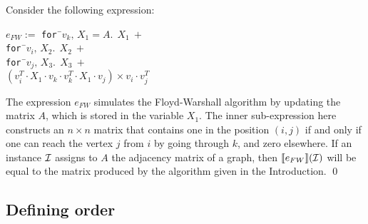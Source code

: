 \begin{example}\label{ex:floyd}
Consider the following expression:
\begin{center}
\parbox{0cm}{
\begin{tabbing}
$e_{FW} := $ \texttt{for\,}\=$v_k,\, X_1\!=\!A.\ \ X_1 \ + $\\
\> \texttt{for\,}\=$v_i, \, X_2.\ \ X_2 \ +$ \\
\>\>\texttt{for\,}\=$v_j,\, X_3.\ \ X_3 \ +$ \\
\>\>\>$(v_i^T\cdot X_1\cdot v_k \cdot v_k^T\cdot X_1\cdot v_j)\times v_i\cdot v_j^T$
\end{tabbing}
}
\end{center}
The expression $e_{FW}$ simulates the Floyd-Warshall algorithm by updating the matrix $A$, which is stored in the variable $X_1$. The inner sub-expression here constructs an $n\times n$ matrix that contains one in the position $(i,j)$ if and only if one can reach the vertex $j$ from $i$ by going through $k$, and zero elsewhere. If an instance $\mathcal{I}$ assigns to $A$ the adjacency matrix of a graph, then $\llbracket e_{FW} \rrbracket(\mathcal{I})$ will be equal to the matrix produced by the algorithm given in the Introduction.
\qed
\end{example}

\subsection{Defining order}
\label{sec:formatlang:design}


